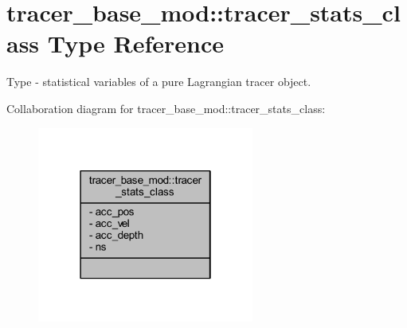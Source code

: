 \hypertarget{structtracer__base__mod_1_1tracer__stats__class}{}\section{tracer\+\_\+base\+\_\+mod\+:\+:tracer\+\_\+stats\+\_\+class Type Reference}
\label{structtracer__base__mod_1_1tracer__stats__class}


Type -\/ statistical variables of a pure Lagrangian tracer object.  




Collaboration diagram for tracer\+\_\+base\+\_\+mod\+:\+:tracer\+\_\+stats\+\_\+class\+:\nopagebreak
\begin{figure}[H]
\begin{center}
\leavevmode
\includegraphics[width=202pt]{structtracer__base__mod_1_1tracer__stats__class__coll__graph}
\end{center}
\end{figure}
